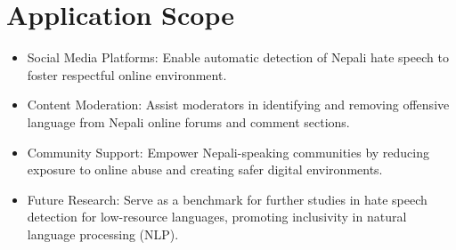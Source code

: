 \section{Application Scope}


\begin{itemize}
\item Social Media Platforms: Enable automatic detection of Nepali hate speech to foster respectful online environment.
\item Content Moderation: Assist moderators in identifying and removing offensive language from Nepali online forums and comment sections.
\item Community Support: Empower Nepali-speaking communities by reducing exposure to online abuse and creating safer digital environments.
\item Future Research: Serve as a benchmark for further studies in hate speech detection for low-resource languages, promoting inclusivity in natural language processing (NLP).
\end{itemize}
